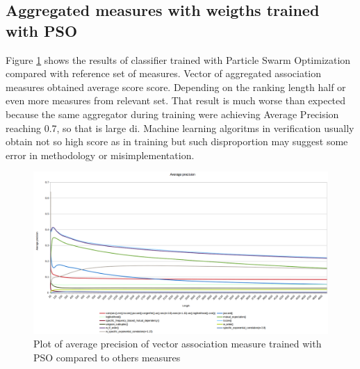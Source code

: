 \subsection{Aggregated measures with weigths trained with PSO}
Figure \ref{pso_verif} shows the results of classifier trained with Particle Swarm Optimization compared with reference set of measures. 
Vector of aggregated association measures obtained average score score. Depending on the ranking length half or even more measures from 
relevant set. That result is much worse than expected because the same aggregator during training were achieving Average Precision 
reaching 0.7, so that is large di. Machine learning algoritms in verification usually obtain not so high score as in training but 
such disproportion may suggest some error in methodology or misimplementation.

\begin{figure}[ht]
    \centering
    \includegraphics[scale=0.32]{img/pso_verif.png}
    \caption{Plot of average precision of vector association measure trained with PSO compared to others measures}
    \label{pso_verif}
\end{figure}